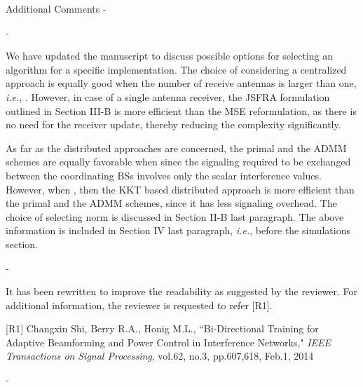 \begin{enumerate}
Additional Comments - 

\begin{enumerate}
	
	 - 
	
	\resp We have updated the manuscript to discuss possible options for selecting an algorithm for a specific implementation. The choice of considering a centralized approach is equally good when the number of receive antennas is larger than one, \textit{i.e.}, . However, in case of a single antenna receiver, the \ac{JSFRA} formulation outlined in Section III-B is more efficient than the \ac{MSE} reformulation, as there is no need for the receiver update, thereby reducing the complexity significantly.
	
	As far as the distributed approaches are concerned, the primal and the \ac{ADMM} schemes are equally favorable when  since the signaling required to be exchanged between the coordinating \acp{BS} involves only the scalar interference values. However, when , then the \ac{KKT} based distributed approach is more efficient than the primal and the \ac{ADMM} schemes, since it has less signaling overhead. The choice of selecting  norm is discussed in Section II-B last paragraph. The above information is included in Section IV last paragraph, \textit{i.e.}, before the simulations section.
	
	 - 
	
	\resp It has been rewritten to improve the readability as suggested by the reviewer. For additional information, the reviewer is requested to refer [R1].
	
	[R1] Changxin Shi, Berry R.A., Honig M.L., ``{Bi-Directional Training for Adaptive Beamforming and Power Control in Interference Networks}," \textit{IEEE Transactions on Signal Processing}, vol.62, no.3, pp.607,618, Feb.1, 2014
	
	 - 
	

\end{enumerate}
\end{enumerate}
